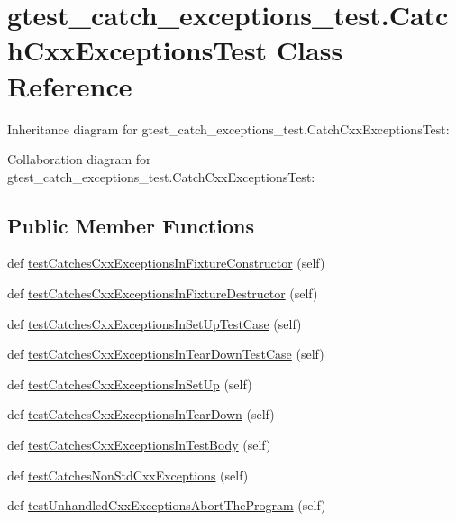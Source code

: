 \hypertarget{classgtest__catch__exceptions__test_1_1_catch_cxx_exceptions_test}{}\section{gtest\+\_\+catch\+\_\+exceptions\+\_\+test.\+Catch\+Cxx\+Exceptions\+Test Class Reference}
\label{classgtest__catch__exceptions__test_1_1_catch_cxx_exceptions_test}


Inheritance diagram for gtest\+\_\+catch\+\_\+exceptions\+\_\+test.\+Catch\+Cxx\+Exceptions\+Test\+:


Collaboration diagram for gtest\+\_\+catch\+\_\+exceptions\+\_\+test.\+Catch\+Cxx\+Exceptions\+Test\+:
\subsection*{Public Member Functions}
\begin{DoxyCompactItemize}
\item 
def \hyperlink{classgtest__catch__exceptions__test_1_1_catch_cxx_exceptions_test_a7d02a890df0e3990aa107288c21f7dc7}{test\+Catches\+Cxx\+Exceptions\+In\+Fixture\+Constructor} (self)
\item 
def \hyperlink{classgtest__catch__exceptions__test_1_1_catch_cxx_exceptions_test_a3fe17da71b72c1693fa358f71c6b31be}{test\+Catches\+Cxx\+Exceptions\+In\+Fixture\+Destructor} (self)
\item 
def \hyperlink{classgtest__catch__exceptions__test_1_1_catch_cxx_exceptions_test_a8e791760b553d92490005deea0812f44}{test\+Catches\+Cxx\+Exceptions\+In\+Set\+Up\+Test\+Case} (self)
\item 
def \hyperlink{classgtest__catch__exceptions__test_1_1_catch_cxx_exceptions_test_a56c906c34e689ee016ab1bf14fe5220c}{test\+Catches\+Cxx\+Exceptions\+In\+Tear\+Down\+Test\+Case} (self)
\item 
def \hyperlink{classgtest__catch__exceptions__test_1_1_catch_cxx_exceptions_test_a6451307941e063bcc3927992c1f2df54}{test\+Catches\+Cxx\+Exceptions\+In\+Set\+Up} (self)
\item 
def \hyperlink{classgtest__catch__exceptions__test_1_1_catch_cxx_exceptions_test_a40ba50bf018753b7b21ed93ed60e4e1c}{test\+Catches\+Cxx\+Exceptions\+In\+Tear\+Down} (self)
\item 
def \hyperlink{classgtest__catch__exceptions__test_1_1_catch_cxx_exceptions_test_ac73b336590a3d1c242124e9ea5464a42}{test\+Catches\+Cxx\+Exceptions\+In\+Test\+Body} (self)
\item 
def \hyperlink{classgtest__catch__exceptions__test_1_1_catch_cxx_exceptions_test_a922cb0b598034924c19e6695cc9f7513}{test\+Catches\+Non\+Std\+Cxx\+Exceptions} (self)
\item 
def \hyperlink{classgtest__catch__exceptions__test_1_1_catch_cxx_exceptions_test_af3a794d5af0b3d72789293531468050a}{test\+Unhandled\+Cxx\+Exceptions\+Abort\+The\+Program} (self)
\end{DoxyCompactItemize}


